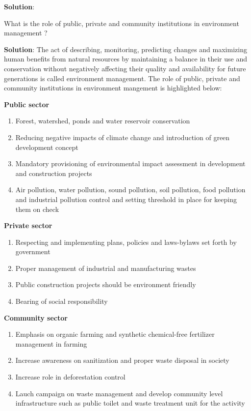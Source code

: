 \documentclass[
]{book}
\newcommand{\question}{\item}
\newenvironment{solution}{ {\bfseries Solution}:}{}
\begin{document}
\begin{questions}
\begin{solution}
\end{solution}

\question What is the role of public, private and community institutions in environment management ?

\begin{solution}
The act of describing, monitoring, predicting changes and maximizing human benefits from natural resources by maintaining a balance in their use and conservation without negatively affecting their quality and availability for future generations is called environment management. The role of public, private and community institutions in environment mangement is highlighted below:

\textbf{Public sector}

\begin{enumerate}
\item Forest, watershed, ponds and water reservoir conservation
\item Reducing negative impacts of climate change and introduction of green development concept
\item Mandatory provisioning of environmental impact assessment in development and construction projects
\item Air pollution, water pollution, sound pollution, soil pollution, food pollution and industrial pollution control and setting threshold in place for keeping them on check
\end{enumerate}

\textbf{Private sector}

\begin{enumerate}
\item Respecting and implementing plans, policies and laws-bylaws set forth by government
\item Proper management of industrial and manufacturing wastes
\item Public construction projects should be environment friendly
\item Bearing of social responsibility
\end{enumerate}

\textbf{Community sector}
\begin{enumerate}
\item Emphasis on organic farming and synthetic chemical-free fertilizer management in farming
\item Increase awareness on sanitization and proper waste disposal in society
\item Increase role in deforestation control
\item Lauch campaign on waste management and develop community level infrastructure such as public toilet and waste treatment unit for the activity
\end{enumerate}


\end{solution}
\end{questions}
\end{document}
